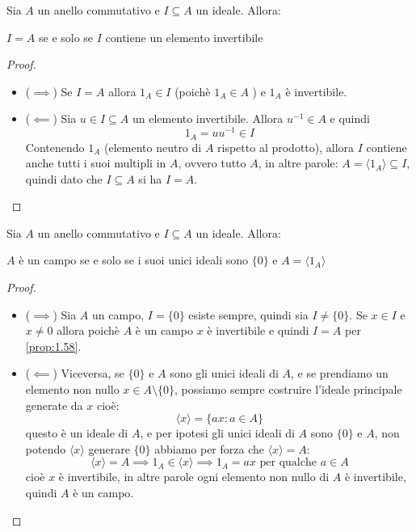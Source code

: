 \documentclass[../main.tex]{subfiles}
\begin{document}
\begin{proposition}
    \label{prop:1.58}
    Sia $A$ un anello commutativo e $I \subseteq A$ un ideale. Allora:
    \begin{center}
        $I = A$ se e solo se $I$ contiene un elemento invertibile
    \end{center}
\end{proposition}
\begin{proof}\
    \begin{itemize}
        \item ($\implies$) Se $I = A$ allora $1_A \in I$ (poichè $1_A \in A$ ) e $1_A$ è invertibile.

        \item ($\impliedby$) Sia $u \in I \subseteq A$ un elemento invertibile. Allora $u^{-1} \in A$ e quindi
              \[
                  1_A = u u^{-1} \in I
              \]
              Contenendo $1_A$ (elemento neutro di $A$ rispetto al prodotto), allora $I$ contiene anche tutti i suoi multipli in $A$, ovvero tutto $A$, in altre parole: $A = \langle 1_A \rangle \subseteq I$, quindi dato che $I \subseteq A$ si ha $I = A$.
    \end{itemize}
\end{proof}
\begin{proposition}
    \label{prop:1.59}
    Sia $A$ un anello commutativo e $I \subseteq A$ un ideale. Allora:
    \begin{center}
        $A$ è un campo se e solo se i suoi unici ideali sono $\{0\}$ e $A = \langle 1_A \rangle$
    \end{center}
\end{proposition}
\begin{proof}\
    \begin{itemize}
        \item ($\implies$) Sia $A$ un campo, $I = \{0\}$ esiste sempre, quindi sia $I \neq \{0\}$. Se $x \in I$ e $x \neq 0$ allora poichè $A$ è un campo $x$ è invertibile e quindi $I = A$ per \ref{prop:1.58}.

        \item ($\impliedby$) Viceversa, se $\{0\}$ e $A$ sono gli unici ideali di $A$, e se prendiamo un elemento non nullo $x \in A  \setminus \{0\}$, possiamo sempre costruire l'ideale principale generate da $x$ cioè:
              \[
                  \langle x \rangle = \{a x : a \in A\}
              \]
              questo è un ideale di $A$, e per ipotesi gli unici ideali di $A$ sono $\{0\}$ e $A$, non potendo $\langle x \rangle$ generare $\{0\}$ abbiamo per forza che $\langle x \rangle = A$:
              \[
                  \langle x \rangle = A \implies 1_A \in \langle x \rangle \implies 1_A = a x \text{ per qualche } a \in A
              \]
              cioè $x$ è invertibile, in altre parole ogni elemento non nullo di $A$ è invertibile, quindi $A$ è un campo.
    \end{itemize}
\end{proof}
\end{document}
